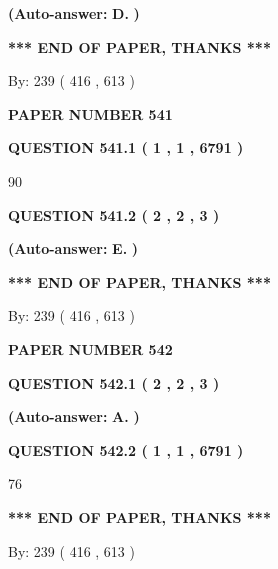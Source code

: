 \documentclass[12pt]{article}
\begin{document}
 
{\textbf{(Auto-answer:}}
{\textbf{\large{
D.}}}
{\textbf{)}}
 
 
   
   
   
   
\vspace{1.0in} 
{\textbf{\large{ *** END OF PAPER, THANKS *** }}} 
   
   
\hspace{1.0in} By: 
 239 ( 416 ,  613 )
   
   
   
   
\newpage 
\setcounter{page}{ 
   541001 } 
   
   
 {\textbf{ \Large{ PAPER NUMBER  541  }}}
   
   
   
   
  
  
{\textbf{\large{QUESTION
541.1 
 ( 1 , 1 , 6791 )
}}}

90
  
  
{\textbf{\large{QUESTION
541.2 
 ( 2 , 2 , 3 )
}}}
 
 
{\textbf{(Auto-answer:}}
{\textbf{\large{
E.}}}
{\textbf{)}}
 
 
   
   
   
   
\vspace{1.0in} 
{\textbf{\large{ *** END OF PAPER, THANKS *** }}} 
   
   
\hspace{1.0in} By: 
 239 ( 416 ,  613 )
   
   
   
   
\newpage 
\setcounter{page}{ 
   542001 } 
   
   
 {\textbf{ \Large{ PAPER NUMBER  542  }}}
   
   
   
   
  
  
{\textbf{\large{QUESTION
542.1 
 ( 2 , 2 , 3 )
}}}
 
 
{\textbf{(Auto-answer:}}
{\textbf{\large{
A.}}}
{\textbf{)}}
 
 
  
  
{\textbf{\large{QUESTION
542.2 
 ( 1 , 1 , 6791 )
}}}

76
   
   
   
   
\vspace{1.0in} 
{\textbf{\large{ *** END OF PAPER, THANKS *** }}} 
   
   
\hspace{1.0in} By: 
 239 ( 416 ,  613 )
   
   
   
\end{document}
